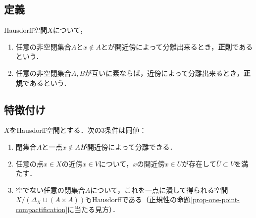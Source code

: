 \documentclass[uplatex,dvipdfmx]{jsreport}
\begin{document}
\subsection{定義}

\begin{definition}
    Hausdorff空間$X$について，
    \begin{enumerate}
        \item 任意の非空閉集合$A$と$x\notin A$とが開近傍によって分離出来るとき，\textbf{正則}であるという．
        \item 任意の非空閉集合$A,B$が互いに素ならば，近傍によって分離出来るとき，\textbf{正規}であるという．
    \end{enumerate}
\end{definition}

\subsection{特徴付け}

\begin{proposition}[正則性の特徴付け]
    $X$をHausdorff空間とする．次の3条件は同値：
    \begin{enumerate}
        \item 閉集合$A$と一点$x\notin A$が開近傍によって分離できる．
        \item 任意の点$x\in X$の近傍$x\in V$について，$x$の開近傍$x\in U$が存在して$\overline{U}\subset V$を満たす．
        \item 空でない任意の閉集合$A$について，これを一点に潰して得られる空間$X/(\Delta_X\cup(A\times A))$もHausdorffである（正規性の命題\ref{prop-one-point-compactification}に当たる見方）．
    \end{enumerate}
\end{proposition}
\end{document}
